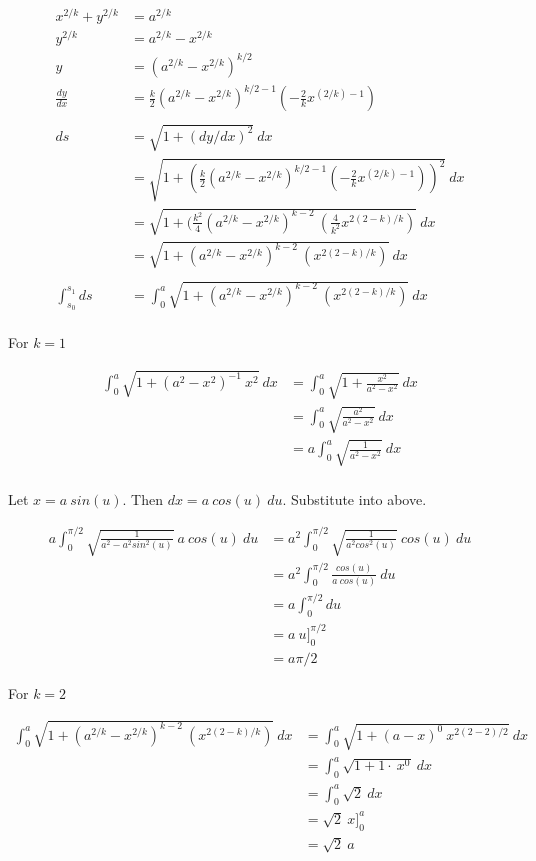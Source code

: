 \documentclass[9pt]{article}
\begin{document}
\begin{align*}
  x^{2/k} + y^{2/k} &= a^{2/k} \\
  y^{2/k} &= a^{2/k} - x^{2/k} \\
  y &= (a^{2/k} - x^{2/k})^{k/2} \\
  \frac{dy}{dx} &= \frac{k}{2}(a^{2/k} - x^{2/k})^{k/2 - 1}(-\frac{2}{k}x^{(2/k) - 1}) \\
\\
  ds &= \sqrt{1 + (dy/dx)^2} \ dx \\
  &= \sqrt{1 + (\frac{k}{2}(a^{2/k} - x^{2/k})^{k/2 - 1}(-\frac{2}{k}x^{(2/k) - 1}))^2} \ dx \\
  &= \sqrt{1 + (\frac{k^2}{4}(a^{2/k} - x^{2/k})^{k - 2} \ (\frac{4}{k^2}x^{2(2 - k)/k})} \ dx \\
  &= \sqrt{1 + (a^{2/k} - x^{2/k})^{k - 2} \ (x^{2(2 - k)/k})} \ dx \\
  \\
  \int_{s_0}^{s_1} ds &= \int_{0}^{a} \sqrt{1 + (a^{2/k} - x^{2/k})^{k - 2} \ (x^{2(2 - k)/k})} \ dx \\
\end{align*}

For $k = 1$

\begin{align*}
  \int_{0}^{a} \sqrt{1 + (a^2 - x^2)^{-1} \ x^2} \ dx &= \int_{0}^{a} \sqrt{1 + \frac{x^2}{a^2 - x^2}} \ dx \\
  &= \int_{0}^{a} \sqrt{\frac{a^2}{a^2 - x^2}} \ dx \\
  &= a \int_{0}^{a} \sqrt{\frac{1}{a^2 - x^2}} \ dx \\
\end{align*}

Let $x = a\ sin(u)$. Then $dx = a\ cos(u)\ du$. Substitute into above.

\begin{align*}
  a \int_{0}^{\pi / 2} \sqrt{\frac{1}{a^2 - a^2 sin^2(u)}} \ a \ cos(u) \ du &= a^2 \int_{0}^{\pi / 2} \sqrt{\frac{1}{a^2 cos^2(u)}} \ cos(u) \ du \\
  &= a^2 \int_{0}^{\pi / 2} \frac{cos(u)}{a\ cos(u)} \ du \\
  &= a \int_{0}^{\pi / 2} du \\
  &= a\ u \bigg]_0^{\pi / 2} \\
  &= a\pi / 2
\end{align*}

For $k = 2$

\begin{align*}
  \int_{0}^{a} \sqrt{1 + (a^{2/k} - x^{2/k})^{k - 2} \ (x^{2(2 - k)/k})} \ dx &= \int_0^a \sqrt{1 + (a - x)^0 \ x^{2(2 - 2) / 2}} \ dx \\
  &= \int_0^a \sqrt{1 + 1 \cdot \ x^0} \ dx \\
  &= \int_0^a \sqrt{2} \ dx \\
  &= \sqrt{2}\ x \bigg]_0^a \\
  &= \sqrt{2} \ a
\end{align*}
\end{document}

